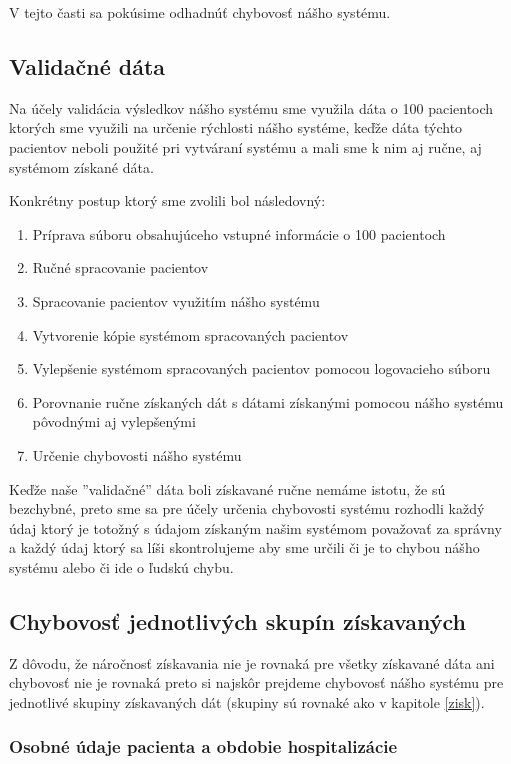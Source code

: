 V tejto časti sa pokúsime odhadnúť chybovosť nášho systému. 

\subsection{Validačné dáta}

Na účely validácia výsledkov nášho systému sme využila dáta o 100 pacientoch ktorých sme využili na určenie rýchlosti nášho systéme, keďže dáta týchto pacientov neboli použité pri vytváraní systému a mali sme k nim aj ručne, aj systémom získané dáta. 

Konkrétny postup ktorý sme zvolili bol následovný:

\begin{enumerate}
	\item Príprava súboru obsahujúceho vstupné informácie o 100 pacientoch
	\item Ručné spracovanie pacientov
	\item Spracovanie pacientov využitím nášho systému
	\item Vytvorenie kópie systémom spracovaných pacientov
	\item Vylepšenie systémom spracovaných pacientov pomocou logovacieho súboru 
	\item Porovnanie ručne získaných dát s dátami získanými pomocou nášho systému pôvodnými aj vylepšenými
	\item Určenie chybovosti nášho systému   
\end{enumerate}

Keďže naše ''validačné'' dáta boli získavané ručne nemáme istotu, že sú bezchybné, preto sme sa pre účely určenia chybovosti systému rozhodli každý údaj ktorý je totožný s údajom získaným našim systémom považovať za správny a každý údaj ktorý sa líši skontrolujeme aby sme určili či je to chybou nášho systému alebo či ide o ľudskú chybu.


\subsection{Chybovosť jednotlivých skupín získavaných}

Z dôvodu, že náročnosť získavania nie je rovnaká pre všetky získavané dáta ani chybovosť nie je rovnaká preto si najskôr prejdeme chybovosť nášho systému pre jednotlivé skupiny získavaných dát (skupiny sú rovnaké ako v kapitole \ref{zisk}).

\subsubsection{Osobné údaje pacienta a obdobie hospitalizácie}

